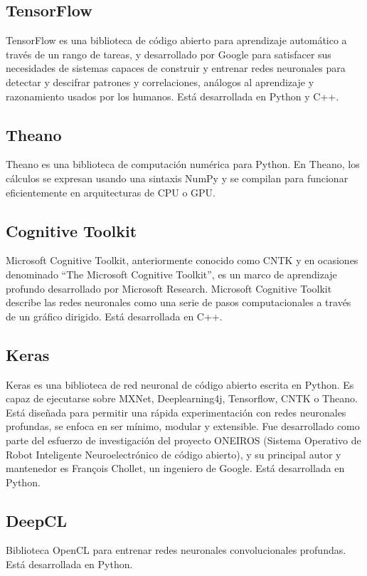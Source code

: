 \bigskip

\subsection{TensorFlow}
TensorFlow es una biblioteca de código abierto para aprendizaje automático a través de un rango de tareas, y desarrollado por Google para satisfacer sus necesidades de sistemas capaces de construir y entrenar redes neuronales para detectar y descifrar patrones y correlaciones, análogos al aprendizaje y razonamiento usados por los humanos. Está desarrollada en Python y C++.

\subsection{Theano}
Theano es una biblioteca de computación numérica para Python. En Theano, los cálculos se expresan usando una sintaxis NumPy y se compilan para funcionar eficientemente en arquitecturas de CPU o GPU.

\subsection{Cognitive Toolkit}
Microsoft Cognitive Toolkit, anteriormente conocido como CNTK y en ocasiones denominado ``The Microsoft Cognitive Toolkit'', es un marco de aprendizaje profundo desarrollado por Microsoft Research. Microsoft Cognitive Toolkit describe las redes neuronales como una serie de pasos computacionales a través de un gráfico dirigido. Está desarrollada en C++.

\subsection{Keras}
Keras es una biblioteca de red neuronal de código abierto escrita en Python. Es capaz de ejecutarse sobre MXNet, Deeplearning4j, Tensorflow, CNTK o Theano. Está diseñada para permitir una rápida experimentación con redes neuronales profundas, se enfoca en ser mínimo, modular y extensible. Fue desarrollado como parte del esfuerzo de investigación del proyecto ONEIROS (Sistema Operativo de Robot Inteligente Neuroelectrónico de código abierto), y su principal autor y mantenedor es François Chollet, un ingeniero de Google. Está desarrollada en Python.

\subsection{DeepCL}
Biblioteca OpenCL para entrenar redes neuronales convolucionales profundas. Está desarrollada en Python.

